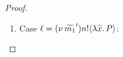 \begin{proof}
\begin{enumerate}
				\noi From transition \eqref{lem:wb_is_wbc1} we conclude:
			\[
				\horel{\Gamma}{\Delta_2}{Q_1}{\Hby{\news{\widetilde{m_2}'} \bactout{n}{m_2}}}{\Delta_2'}{Q_2}
			\]
				\noi and for fresh $t$
			\[
				\horel	{\Gamma}{\Delta_1'}{\newsp{\widetilde{m_1}'}{P_2 \Par \htrigger{t}{m_1}}}
				{\hwb}
				{\Delta_2'}{\newsp{\widetilde{m_2}'}{Q_2 \Par \htrigger{t}{m_2}}}
			\]
				\noi From the  second case of this proof we can conclude that $\forall R$ with $\fpv{R} = \set{x}$:
			\[
				\begin{array}{rl}
					\Gamma; \es; &\Delta_1' \proves \newsp{\widetilde{m_1}'}{P_2 \Par \htrigger{t}{m_1}} \\
					\by{\bactinp{t}{\abs{z}{\binp{z}{x} R}}}& \newsp{\widetilde{m_1}'}{P_2 \Par \newsp{s}{\binp{s}{x} R \Par \bout{\dual{s}}{m_1} \inact }}\\
					\by{\tau} \quad &\Delta_1'' \proves \newsp{\widetilde{m_1}'}{P_2 \Par  R \subst{m_1}{x}}
				\end{array}
			\]
				\noi and
			\[
				\begin{array}{rl}
					\Gamma; \es; &\Delta_2' \proves \newsp{\widetilde{m_2}'}{Q_2 \Par \htrigger{t}{m_2} } \\
					\by{\bactinp{t}{\abs{z}{\binp{z}{x} R}}} &\newsp{\widetilde{m_2}'}{Q_2 \Par \newsp{s}{\binp{s}{x} R \Par \bout{\dual{s}}{m_2} \inact}}\\
					\by{\tau} &\Delta_2'' \proves \newsp{\widetilde{m_2}'}{Q_2 \Par  R \subst{m_2}{x}}
				\end{array}
			\]
				\noi and furthermore it is easy to see that $\forall R$ with $\fpv{R} = \set{x}$:
			\[
				\horel{\Gamma}{\Delta_1''}{\newsp{\widetilde{m_1}'}{P_2 \Par  R \subst{m_1}{x}}}{\hwb}{\Delta_2}{\newsp{\widetilde{m_2}'}{Q_2 \Par R \subst{m_2}{x}} }
			\]
				\noi as required by the definition of $\wbc$.



		\item	Case $\ell = (\nu\, \widetilde{m_1}') n ! \langle \lambda \widetilde{x}.\,P \rangle$:


\end{enumerate}
\end{proof}
